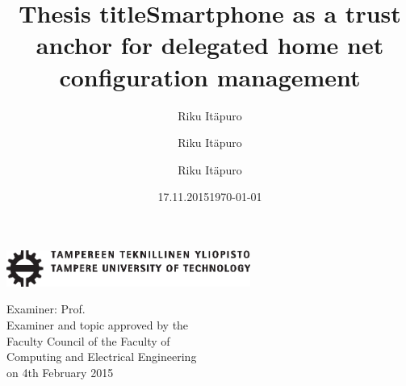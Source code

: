 \documentclass[12pt,a4paper,english]{tutthesis}
\author{Riku Itäpuro}
\title{Thesis title}      %
\author{Riku Itäpuro}
\title{Smartphone as a trust anchor for delegated home net configuration management}
\author{Riku Itäpuro}
\date{17.11.2015}
\title{}
\begin{document}



\newpage             %

 \pagestyle{headings}
 \thispagestyle{empty}
\date\today
 \vspace*{-.5cm}\noindent
 \includegraphics[width=8cm]{tty_tut_logo}   %

\vspace{6.8cm}
\maketitle
\vspace{6.7cm} %
 
\begin{flushright}  
  \begin{minipage}[c]{6.8cm}
    \begin{spacing}{1.0}
      \textsf{Examiner: Prof. \@examiner}\\
      \textsf{Examiner and topic approved by the}\\ 
      \textsf{Faculty Council of the Faculty of} \\
      \textsf{Computing and Electrical Engineering} \\
      \textsf{on 4th February 2015}\\
    \end{spacing}
  \end{minipage}
\end{flushright}


\if@twoside
\clearpage
\fi
\end{document}

